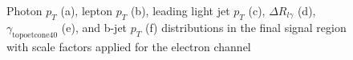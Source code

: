\begin{figure}[]
\hfil  %
\caption{Photon $p_T$ (a), lepton $p_T$ (b), leading light jet $p_T$ (c), $\Delta R_{l\gamma}$ (d), $\gamma_\text{topoetcone40}$ (e), and b-jet $p_T$ (f) distributions in the final signal region with scale factors applied for the electron channel }
\label{fig:SRej1}
\end{figure}


